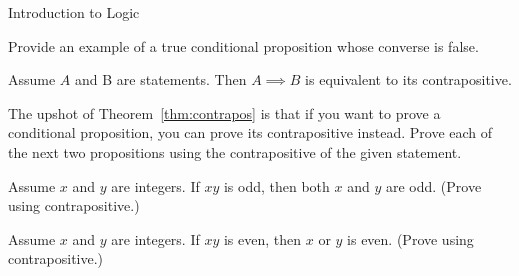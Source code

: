 \begin{section}{Introduction to Logic}
\begin{exercise}
Provide an example of a true conditional proposition whose converse is false.
\end{exercise}

\begin{theorem}\label{thm:contrapos}
Assume $A$ and B are statements.  Then ${A\implies B}$ is equivalent to its contrapositive.
\end{theorem}

The upshot of Theorem~\ref{thm:contrapos} is that if you want to prove a conditional proposition, you can prove its contrapositive instead.  Prove each of the next two propositions using the contrapositive of the given statement.

\begin{theorem}
Assume $x$ and $y$ are integers.  If $xy$ is odd, then both $x$ and $y$ are odd. (Prove using contrapositive.)
\end{theorem}

\begin{theorem}
Assume $x$ and $y$ are integers.  If $xy$ is even, then $x$ or $y$ is even.  (Prove using contrapositive.)
\end{theorem}

\end{section}